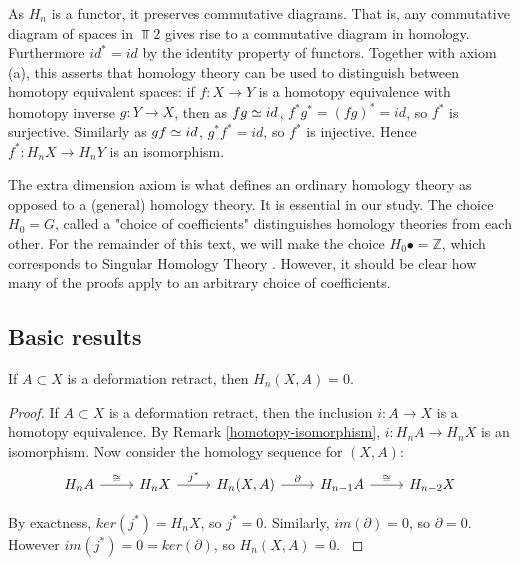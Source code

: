\begin{remark}\label{homotopy-isomorphism}
As $H_n$ is a functor, it preserves commutative diagrams. That is, any commutative diagram of spaces in $\Top{2}$ gives rise to a commutative diagram in homology. Furthermore $id^*=id$ by the identity property of functors. Together with axiom (a), this asserts that homology theory can be used to distinguish between homotopy equivalent spaces: if $f:X\rightarrow Y$ is a homotopy equivalence with homotopy inverse $g:Y\rightarrow X$, then as $fg\simeq id$, $f^*g^*=(fg)^*=id$, so $f^*$ is surjective. Similarly as $gf\simeq id$, $g^*f^*=id$, so $f^*$ is injective. Hence $f^*:H_nX\rightarrow H_nY$ is an isomorphism.
\end{remark}
The extra dimension axiom is what defines an ordinary homology theory as opposed to a (general) homology theory. It is essential in our study. The choice $H_0=G$, called a "choice of coefficients" distinguishes homology theories from each other. For the remainder of this text, we will make the choice $H_0\bullet=\mathbb{Z}$, which corresponds to Singular Homology Theory \cite{Hatcher}. However, it should be clear how many of the proofs apply to an arbitrary choice of coefficients.

\subsection{Basic results}
\begin{prop}
If $A\subset X$ is a deformation retract, then $H_n(X,A)=0$.
\end{prop}
\begin{proof}
If $A\subset X$ is a deformation retract, then the inclusion $i:A\rightarrow X$ is a homotopy equivalence. By Remark \ref{homotopy-isomorphism}, $i:H_nA\rightarrow H_nX$ is an isomorphism. Now consider the homology sequence for $(X,A)$:
\[\begin{tikzcd}
H_nA \arrow[r, "\iso"] & H_nX \arrow[r, "j^*"] & {H_n(X,A)} \arrow[r, "\partial"] & H_{n-1}A \arrow[r, "\iso"] & H_{n-2}X
\end{tikzcd}\]

By exactness, $ker(j^*)=H_nX$, so $j^*=0$. Similarly, $im(\partial)=0$, so $\partial=0$. However $im(j^*)=0=ker(\partial)$, so $H_n(X,A)=0$. \cite{Werndli}
\end{proof}

